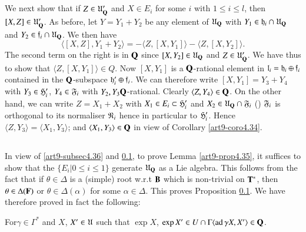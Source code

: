 \subsection{}\label{art9-subsec4.37}
We next show that if $Z \in \mathfrak{U}'_{\mathbf{Q}}$ and $X \in E_i$ for some $i$ with $1 \leqslant i \leqslant l$, then $[X, Z] \in \mathfrak{U}'_{\mathbf{Q}}$. As before, let $Y = Y_1 + Y_2$ be any element of $\mathfrak{U}_{\mathbf{Q}}$ with $Y_1 \in \mathfrak{h}_i \cap \mathfrak{U}_{\mathbf{Q}}$ and $Y_2 \in \mathfrak{f}_i \cap \mathfrak{U}_{\mathbf{Q}}$. We then have 
$$
\langle [X, Z], Y_1 + Y_2 \rangle  = - \langle Z, [X, Y_1]  \rangle - \langle Z , [X, Y_2]\rangle .
$$
The second term on the right is in $\mathbf{Q}$ since $[X, Y_2] \in \mathfrak{U}_{\mathbf{Q}}$ and $Z \in \mathfrak{U}'_{\mathbf{Q}}$. We have thus to show that $\langle Z, [X, Y_1] \rangle \in Q$. Now $[X, Y_1]$ is a $\mathbf{Q}$-rational element in $\mathfrak{l}_i = \mathfrak{h}_i \oplus \mathfrak{f}_i$ contained in the $\mathbf{Q}$-subspace $\mathfrak{h}'_i \oplus \mathfrak{f}_i$. We can therefore write $[X, Y_1] = Y_3 + Y_4$ with $Y_3 \in \mathfrak{H}'_i$, $Y_4 \in\mathfrak{F}_i$ with $Y_2 , Y_3 \mathbf{Q}$-rational. Clearly $\langle Z, Y_4 \rangle \in \mathbf{Q}$. On the other hand, we can write $Z = X_1 + X_2$ with $X_1 \in E_i \subset \mathfrak{H}'_i$ and $X_2 \in \mathfrak{U}_{\mathbf{Q}} \cap \mathfrak{F}_i$ () $\mathfrak{F}_i$ is orthogonal to its normaliser $\mathfrak{N}_i$ hence in particular to $\mathfrak{H}'_i$. Hence $\langle Z, Y_3 \rangle = \langle X_1, Y_3\rangle$; and $\langle X_1, Y_3\rangle  \in \mathbf{Q}$ in view of Corollary \ref{art9-coro4.34}.

\subsection{}\label{art9-subsec4.38}
In view of \ref{art9-subsec4.36} and \ref{art9-subsec4.37}, to prove Lemma \ref{art9-prop4.35}, it suffices to show that the $\{E_i \big| 0 \leqslant i \leqslant 1\}$ generate $\mathfrak{U}_{\mathbf{Q}}$ as a Lie algebra. This follows from the fact that if $\theta \in \Delta$ is a (simple) root w.r.t $\mathbf{B}$ which is non-trivial on $\mathbf{T}^\ast$, then $\theta \in\Delta (\mathbf{F})$ or $\theta \in \Delta (\alpha)$ for some $\alpha \in \Delta$. This proves Proposition \ref{art9-subsec4.37}. We have therefore proved in fact the following:

\setcounter{definition}{38}
\begin{proposition}\label{art9-prop4.39}
For\pageoriginale $\gamma \in \Gamma^\ast$ and $X$, $X' \in \mathfrak{U}$ such that $\exp X$, $\exp X' \in U \cap \Gamma \langle \operatorname{ad} \gamma X, X' \rangle \in \mathbf{Q}$.
\end{proposition}

\setcounter{subsection}{39}
